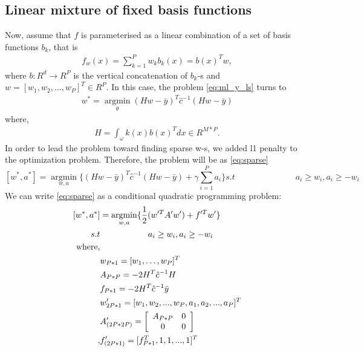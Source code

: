 \subsection{Linear mixture of fixed basis functions}
Now, assume that $f$ is parameterised as a linear combination of a set of basis functions $b_k$, that is
\begin{align}
  f_w(x) = \sum_{k=1}^P w_k b_k(x) = b(x)^T w,
\end{align}
where $b\colon R^d \rightarrow R^P$ is the vertical concatenation of $b_k$-s and $w = [w_1,w_2,\ldots,w_P]^T \in R^P$. In this case, the problem \eqref{eq:ml_y_ls}
turns to
\begin{align}
  \label{eq:ml2_w}
  w^* = \underset{\theta}{\operatorname{argmin}} \left(H w - \bar{y} \right)^T \hat{c}^{-1} \left(Hw - \bar{y} \right) 
\end{align}
where, 
\begin{align}
  \label{eq:H}
  H = \int_\omega k(x) b(x)^T dx \in R^{M * P}.
\end{align}
In order to lead the problem toward finding sparse w-s, we added l1 penalty to the optimization problem. Therefore, the problem will be as \eqref{eq:sparse} 
\begin{equation}
\label{eq:sparse}
[w^*,a^*] =\underset{w,a}{\operatorname{argmin}}\{(Hw-\bar{y})^T\hat{c}^{-1}(Hw-\bar{y})+\gamma\sum_{i=1}^Pa_i \} 
s.t \hspace{3cm} a_i \geq w_i,  a_i \geq -w_i
\end{equation}
We can write \ref{eq:sparse} as a conditional quadratic programming problem:
\begin{align*}
\label{eq:quadP}
[w^*,a^*]&=\underset{w,a}{\operatorname{argmin}}\{\frac{1}{2}(w'^TA'w')+f'^Tw'\}\\
s.t  &\hspace{2cm} a_i \geq w_i,  a_i \geq -w_i \\
\mbox{where},\\
&w_{P*1}=[w_1,\ldots,w_P]^T \\
&A_{P*P}=-2H^T\hat{c}^{-1}H \\
&f_{P*1}=-2H^T\hat{c}^{-1}\bar{y} \\
&w'_{2P*1}=[w_1, w_2, ...,w_P, a_1, a_2 , ..., a_P]^T  \\ 
&A'_{(2P*2P)}=\left[{ \begin{array}{c c}  A_{P*P} & 0 \\ 0 & 0 \\  \end{array}} \right] \\ ,  &f'_{(2P*1)} =[f_{P*1}^T,1,1,...,1]^T \\ \\
\end{align*}
